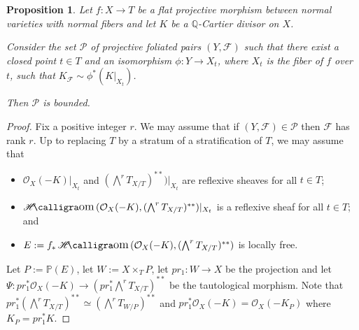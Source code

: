 \documentclass[12pt]{amsart}
\numberwithin{equation}{section}
\DeclareMathOperator{\HHom}{\mathscr{H}\text{\kern -3pt {\calligra\large om}}\,}
\newtheorem{prop}[thm]{Proposition}
\theoremstyle{definition}
\theoremstyle{definition}
\theoremstyle{definition}
\begin{document}
\begin{prop}
\label{prop_pfaff_to_fol}
Let $f\colon X \to T$ be a flat projective morphism between normal varieties with normal 
fibers and let $K$ be a $\mathbb Q$-Cartier divisor on $X$. 

Consider the set 
$\mathcal P$ of projective foliated pairs $(Y,\mathcal F)$ such that there exist a closed point $t\in T$ and an isomorphism $\phi\colon Y\to X_t$, where $X_t$ is the fiber of $f$ over $t$, such that $K_{\mathcal F}\sim \phi^*(K|_{X_t})$.

Then $\mathcal P$ is bounded. 
\end{prop}
\begin{proof}
Fix a positive integer $r$. We may assume that if $(Y,\mathcal F)\in \mathcal P$ then $\mathcal F$ has rank $r$.
Up to replacing $T$ by a stratum of a  stratification of $T$, we may  assume that
\begin{itemize}
\item $\mathcal O_X(-K)\vert_{X_t}$
and 
$(\bigwedge^rT_{X/T})^{**})\vert_{X_t}$ are reflexive sheaves for all $t \in T$;
\item $\HHom (\mathcal O_X(-K), (\bigwedge^rT_{X/T})^{**})\vert_{X_t}$ is a reflexive sheaf for all $t \in T$; and 
\item $E := f_*\HHom (\mathcal O_X(-K), (\bigwedge^rT_{X/T})^{**})$ is locally free. 
\end{itemize}

Let $P := \mathbb P(E)$, let 
$W := X \times_T P$, let $pr_1\colon W \to X$ be the projection  and let 
$\Psi\colon pr_1^*\mathcal O_X(-K) \to (pr_1^*\bigwedge^rT_{X/T})^{**}$ be the tautological morphism.
Note that $pr_1^*(\bigwedge^rT_{X/T})^{**} \simeq (\bigwedge^rT_{W/P})^{**}$ and $pr_1^*\mathcal O_X(-K) = \mathcal O_X(-K_P)$ where $K_P = pr_1^* K$. 


\end{proof}
\end{document}
